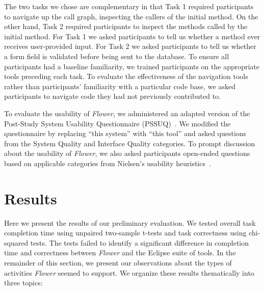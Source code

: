 \documentclass[conference]{IEEEtran}
\begin{document}
The two tasks we chose are complementary in that Task 1 required participants to navigate up the call graph, inspecting the callers of the initial method. 
On the other hand, Task 2 required participants to inspect the methods called by the initial method.
For Task 1 we asked participants to tell us whether a method ever receives user-provided input.
For Task 2 we asked participants to tell us whether a form field is validated before being sent to the database.
To ensure all participants had a baseline familiarity, we trained participants on the appropriate tools preceding each task. 
To evaluate the effectiveness of the navigation tools rather than participants' familiarity with a particular code base, we asked participants to navigate code they had not previously contributed to. 


To evaluate the usability of \textit{Flower}, we administered an adapted version of the Post-Study System Usability Questionnaire (PSSUQ)~\cite{Lewis95ibmcomputer}. We modified the questionnaire by replacing ``this system'' with ``this tool'' and asked questions from the System Quality and Interface Quality categories.
To prompt discussion about the usability of \textit{Flower}, we also asked participants open-ended questions based on applicable categories from Nielsen's usability heuristics~\cite{Nielsen1992}.


\section{Results}
Here we present the results of our preliminary evaluation. 
We tested overall task completion time using unpaired two-sample t-tests and task correctness using chi-squared tests. 
The tests failed to identify a significant difference in completion time and correctness between \textit{Flower} and the Eclipse suite of tools. 
In the remainder of this section, we present our observations about the types of activities \textit{Flower} seemed to support.
We organize these results thematically into three topics:

\end{document}
